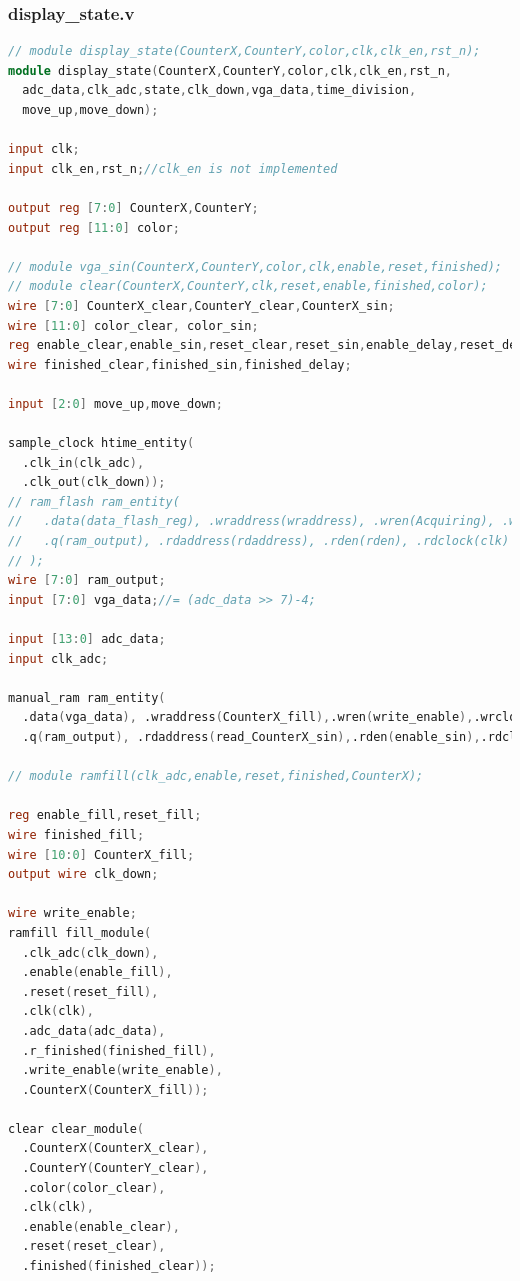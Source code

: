 \documentclass[11pt]{scrartcl}
\begin{document}
\subsubsection{display\_state.v}
\label{sec:displaystatev}
\begin{lstlisting}[language=Verilog]
// module display_state(CounterX,CounterY,color,clk,clk_en,rst_n);
module display_state(CounterX,CounterY,color,clk,clk_en,rst_n,
  adc_data,clk_adc,state,clk_down,vga_data,time_division,
  move_up,move_down);

input clk;
input clk_en,rst_n;//clk_en is not implemented

output reg [7:0] CounterX,CounterY;
output reg [11:0] color;

// module vga_sin(CounterX,CounterY,color,clk,enable,reset,finished);
// module clear(CounterX,CounterY,clk,reset,enable,finished,color);
wire [7:0] CounterX_clear,CounterY_clear,CounterX_sin;
wire [11:0] color_clear, color_sin;
reg enable_clear,enable_sin,reset_clear,reset_sin,enable_delay,reset_delay;
wire finished_clear,finished_sin,finished_delay;

input [2:0] move_up,move_down;

sample_clock htime_entity(
  .clk_in(clk_adc),
  .clk_out(clk_down));
// ram_flash ram_entity(
//   .data(data_flash_reg), .wraddress(wraddress), .wren(Acquiring), .wrclock(clk_flash),
//   .q(ram_output), .rdaddress(rdaddress), .rden(rden), .rdclock(clk)
// );
wire [7:0] ram_output;
input [7:0] vga_data;//= (adc_data >> 7)-4;

input [13:0] adc_data;
input clk_adc;

manual_ram ram_entity(
  .data(vga_data), .wraddress(CounterX_fill),.wren(write_enable),.wrclock(clk_down), 
  .q(ram_output), .rdaddress(read_CounterX_sin),.rden(enable_sin),.rdclock(clk));

// module ramfill(clk_adc,enable,reset,finished,CounterX);

reg enable_fill,reset_fill;
wire finished_fill;
wire [10:0] CounterX_fill;
output wire clk_down;

wire write_enable;
ramfill fill_module(
  .clk_adc(clk_down),
  .enable(enable_fill),
  .reset(reset_fill),
  .clk(clk),
  .adc_data(adc_data),
  .r_finished(finished_fill),
  .write_enable(write_enable),
  .CounterX(CounterX_fill));

clear clear_module(
  .CounterX(CounterX_clear),
  .CounterY(CounterY_clear),
  .color(color_clear),
  .clk(clk),
  .enable(enable_clear),
  .reset(reset_clear),
  .finished(finished_clear));


\end{lstlisting}
\end{document}
